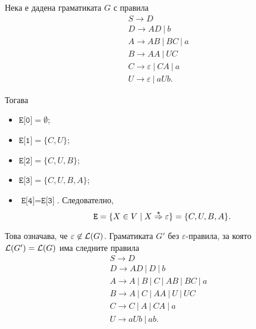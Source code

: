 {\scriptsize
\begin{multicols}{2}
  \begin{example}
  Нека е дадена граматиката $G$ с правила
  \begin{align*}
    & S \to D\\
    & D \to AD\ |\ b\\
    & A \to AB\ |\ BC\ |\ a\\
    & B \to AA\ |\ UC\\
    & C \to \varepsilon\ |\ CA\ |\ a\\
    & U \to \varepsilon\ |\ aUb.
  \end{align*}

  Тогава
  \begin{itemize}[-]
  \item
    $\texttt{E[0]} = \emptyset$;
  \item
    $\texttt{E[1]} = \{C,U\}$;
  \item
    $\texttt{E[2]} = \{C,U,B\}$;
  \item
    $\texttt{E[3]} = \{C,U,B,A\}$;
  \item
    $\texttt{E[4]} = \texttt{E[3]}$. Следователно,
    \[\texttt{E} = \{X \in V \mid X \stackrel{{\star}}{\Rightarrow} \varepsilon\} = \{C,U,B,A\}.\]
  \end{itemize}
  
  Това означава, че $\varepsilon \not\in \mathcal{L}(G)$.
  Граматиката $G'$ без $\varepsilon$-правила, за която $\mathcal{L}(G') = \mathcal{L}(G)$ има следните правила
  \begin{align*}
    & S \to D \\
    & D\to AD\ |\ D\ |\ b \\
    & A \to A\ |\ B\ |\ C\ |\ AB\ |\ BC\ |\ a \\
    & B\to A\ |\ C\ |\ AA\ |\ U\ |\ UC\\
    & C \to C\ |\ A\ |\ CA\ |\ a\\
    & U \to aUb\ |\ ab.
  \end{align*}
\end{example}
\end{multicols}

}

